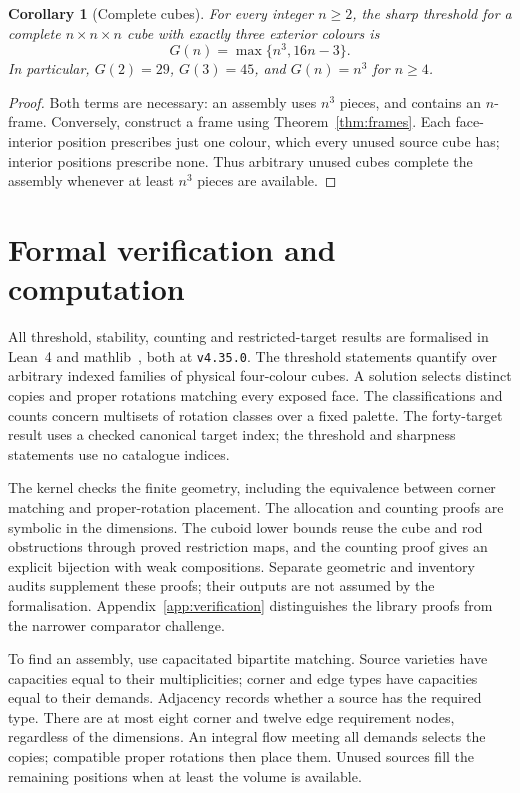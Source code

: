 \documentclass[11pt]{article}
\newtheorem{corollary}{Corollary}
\theoremstyle{remark}
\begin{document}
\begin{corollary}[Complete cubes]\label{cor:full-cubes}
For every integer $n\ge2$, the sharp threshold for a complete
$n\times n\times n$ cube with exactly three exterior colours is
\[
 G(n)=\max\{n^3,16n-3\}.
\]
In particular, $G(2)=29$, $G(3)=45$, and $G(n)=n^3$ for $n\ge4$.
\end{corollary}
\begin{proof}
Both terms are necessary: an assembly uses $n^3$ pieces, and contains an
$n$-frame. Conversely, construct a frame using Theorem~\ref{thm:frames}.
Each face-interior position prescribes just one colour, which every unused
source cube has; interior positions prescribe none. Thus arbitrary unused
cubes complete the assembly whenever at least $n^3$ pieces are available.
\end{proof}



\section{Formal verification and computation}
All threshold, stability, counting and restricted-target results are
formalised in Lean~4 and mathlib~\cite{Lean4,mathlib}, both at
\texttt{v4.35.0}. The threshold statements quantify over arbitrary indexed
families of physical four-colour cubes. A solution selects distinct copies
and proper rotations matching every exposed face. The classifications and
counts concern multisets of rotation classes over a fixed palette. The
forty-target result uses a checked canonical target index; the threshold
and sharpness statements use no catalogue indices.

The kernel checks the finite geometry, including the equivalence between
corner matching and proper-rotation placement. The allocation and counting
proofs are symbolic in the dimensions. The cuboid lower bounds reuse the
cube and rod obstructions through proved restriction maps, and the counting
proof gives an explicit bijection with weak compositions. Separate geometric
and inventory audits supplement these proofs; their outputs are not assumed
by the formalisation. Appendix~\ref{app:verification} distinguishes the
library proofs from the narrower comparator challenge.

To find an assembly, use capacitated bipartite matching. Source varieties
have capacities equal to their multiplicities; corner and edge types have
capacities equal to their demands. Adjacency records whether a source has
the required type. There are at most eight corner and twelve edge
requirement nodes, regardless of the dimensions. An integral flow meeting
all demands selects the copies; compatible proper rotations then place
them. Unused sources fill the remaining positions when at least the volume
is available.
\end{document}
